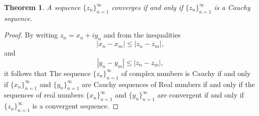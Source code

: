 \documentclass{amsart}
\newtheorem{thm}{Theorem}
\begin{document}
\begin{thm}
A sequence \(\{z_n\}_{n=1}^{\infty}\) converges if and only if \(\{z_n\}_{n=1}^{\infty}\) is a Cauchy sequence.
\end{thm}
\begin{proof}
By writing \(z_n = x_n + i y_n\) and from the inequalities
\[ |x_n - x_m | \leq |z_n - z_m|, \]
and
\[ |y_n - y_m | \leq |z_n - z_m|, \]
it follows that The sequence  \(\{z_n\}_{n=1}^{\infty}\) of complex numbers is Cauchy if and only if  \(\{x_n\}_{n=1}^{\infty}\) and \(\{y_n\}_{n=1}^{\infty}\) are Cauchy sequences of Real numbers if and only if  the sequences of real numbers \(\{x_n\}_{n=1}^{\infty}\) and \(\{y_n\}_{n=1}^{\infty}\) are convergent if and only if \(\{z_n\}_{n=1}^{\infty}\) is a convergent sequence.
\end{proof}
\end{document}
